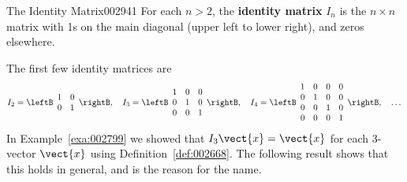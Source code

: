 \begin{definition}{The Identity Matrix}{002941}
For each $n > 2$, the \textbf{identity matrix} $I_{n}$ is the $n \times n$ matrix with 1s on the main diagonal (upper left to lower right), and zeros elsewhere.
\end{definition}

\noindent The first few identity matrices are
\begin{equation*}
I_{2} = \leftB \begin{array}{rr}
1 & 0 \\
0 & 1
\end{array} \rightB, \quad I_{3} = \leftB \begin{array}{rrr}
1 & 0 & 0 \\
0 & 1 & 0 \\
0 & 0 & 1
\end{array} \rightB, \quad I_{4} = \leftB \begin{array}{rrrr}
1 & 0 & 0 & 0 \\
0 & 1 & 0 & 0 \\
0 & 0 & 1 & 0 \\
0 & 0 & 0 & 1
\end{array} \rightB, \quad \dots
\end{equation*}
In Example~\ref{exa:002799} we showed that $I_{3}\vect{x} = \vect{x}$ for each $3$-vector $\vect{x}$ using Definition~\ref{def:002668}. The following result shows that this holds in general, and is the reason for the name.


